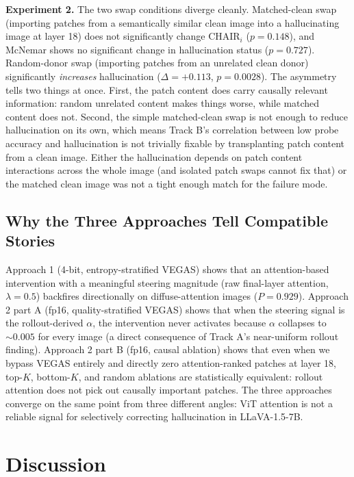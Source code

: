 \documentclass[11pt]{article}
\begin{document}
\textbf{Experiment 2.} The two swap conditions diverge cleanly. Matched-clean swap
(importing patches from a semantically similar clean image into a hallucinating image
at layer 18) does not significantly change $\mathrm{CHAIR}_i$ ($p = 0.148$), and
McNemar shows no significant change in hallucination status ($p = 0.727$). Random-donor
swap (importing patches from an unrelated clean donor) significantly \emph{increases}
hallucination ($\Delta = +0.113$, $p = 0.0028$). The asymmetry tells two things at once.
First, the patch content does carry causally relevant information: random unrelated
content makes things worse, while matched content does not. Second, the simple
matched-clean swap is not enough to reduce hallucination on its own, which means
Track B's correlation between low probe accuracy and hallucination is not trivially
fixable by transplanting patch content from a clean image. Either the hallucination
depends on patch content interactions across the whole image (and isolated patch swaps
cannot fix that) or the matched clean image was not a tight enough match for the
failure mode.

\subsection{Why the Three Approaches Tell Compatible Stories}

Approach 1 (4-bit, entropy-stratified VEGAS) shows that an attention-based intervention
with a meaningful steering magnitude (raw final-layer attention, $\lambda = 0.5$)
backfires directionally on diffuse-attention images ($P = 0.929$). Approach 2 part A
(fp16, quality-stratified VEGAS) shows that when the steering signal is the
rollout-derived $\alpha$, the intervention never activates because $\alpha$ collapses to
$\sim 0.005$ for every image (a direct consequence of Track A's near-uniform rollout
finding). Approach 2 part B (fp16, causal ablation) shows that even when we bypass
VEGAS entirely and directly zero attention-ranked patches at layer 18, top-$K$,
bottom-$K$, and random ablations are statistically equivalent: rollout attention does
not pick out causally important patches. The three approaches converge on the same
point from three different angles: ViT attention is not a reliable signal for
selectively correcting hallucination in LLaVA-1.5-7B.

\section{Discussion}
\end{document}
